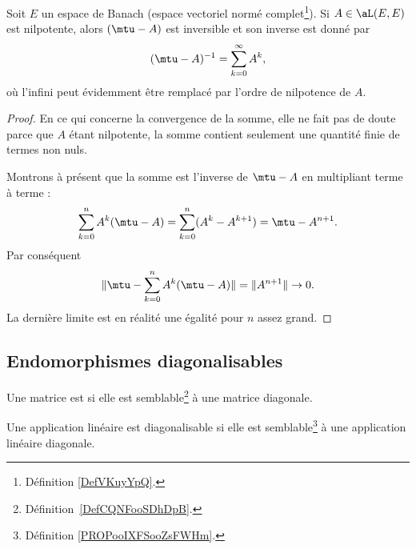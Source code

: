 \begin{proposition}     \label{PROPooWTFWooXHlmhp}
    Soit \( E\) un espace de Banach (espace vectoriel normé complet\footnote{Définition \ref{DefVKuyYpQ}.}). Si \( A\in\aL(E,E)\) est nilpotente, alors \( (\mtu-A)\) est inversible et son inverse est donné par
    \begin{equation}
        (\mtu-A)^{-1}=\sum_{k=0}^{\infty}A^k,
    \end{equation}
    où l'infini peut évidemment être remplacé par l'ordre de nilpotence de \( A\).
\end{proposition}

\begin{proof}
    En ce qui concerne la convergence de la somme, elle ne fait pas de doute parce que \( A\) étant nilpotente, la somme contient seulement une quantité finie de termes non nuls.

    Montrons à présent que la somme est l'inverse de \( \mtu-A\) en multipliant terme à terme :
    \begin{equation}
        \sum_{k=0}^nA^k(\mtu-A)=\sum_{k=0}^n(A^k-A^{k+1})=\mtu-A^{n+1}.
    \end{equation}
    Par conséquent
    \begin{equation}
        \| \mtu-\sum_{k=0}^nA^k(\mtu-A) \|=\| A^{n+1} \|\to 0.
    \end{equation}
    La dernière limite est en réalité une égalité pour \( n\) assez grand.
\end{proof}


\subsection{Endomorphismes diagonalisables}

\begin{definition}  \label{DefCNJqsmo}
    Une matrice est  si elle est semblable\footnote{Définition~\ref{DefCQNFooSDhDpB}.} à une matrice diagonale.

    Une application linéaire est diagonalisable si elle est semblable\footnote{Définition \ref{PROPooIXFSooZsFWHm}.} à une application linéaire diagonale.
\end{definition}


